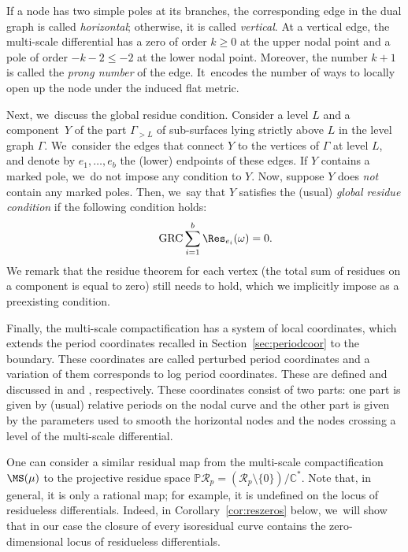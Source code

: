 If a node has two simple poles at its branches, the corresponding edge in the dual graph is called {\em horizontal}; otherwise, it is called {\em vertical}. At a vertical edge, the multi-scale differential has a zero of order $k\geq0$ at the upper nodal point and a pole of order $-k-2\leq-2$ at the lower nodal point.
Moreover, the number $k+1$ is called the {\em prong number} of the edge. It~encodes the number of ways to locally open up the node under the induced flat metric.

Next, we~discuss the global residue condition. Consider a level $L$ and a component~$Y$ of the part $\Gamma_{>L}$ of sub-surfaces lying strictly above $L$ in the level graph $\Gamma$. We~consider the edges that connect $Y$ to the vertices of $\Gamma$ at level $L$, and denote by $e_{1},\dots,e_{b}$ the (lower) endpoints of these edges.
If $Y$ contains a marked pole, we~do not impose any condition to $Y$. Now, suppose $Y$ does {\em not} contain any marked poles. Then, we~say that $Y$ satisfies the (usual) {\em global residue condition} if the following condition holds:\vspace*{-5pt}
\begin{equation}
\tag*{GRC}\label{GRC} \sum_{i=1}^{b}\Res_{e_{i}}(\omega) = 0.
\end{equation}
We remark that the residue theorem for each vertex (\ie the total sum of residues on a component is equal to zero) still needs to hold, which we implicitly impose as a preexisting condition.

Finally, the multi-scale compactification has a system of local coordinates, which extends the period coordinates recalled in Section~\ref{sec:periodcoor} to the boundary. These coordinates are called perturbed period coordinates and a variation of them corresponds to log period coordinates. These are defined and discussed in \cite[\S\S9.2, 13.3]{BCGGM2} and \cite[\S5]{BenBound}, respectively. These coordinates consist of two parts: one part is given by (usual) relative periods on the nodal curve and the other part is given by the parameters used to smooth the horizontal nodes and the nodes crossing a level of the multi-scale differential.\enlargethispage{\baselineskip}

\label{sub:closure}

One can consider a similar residual map from the multi-scale compactification $\MS(\mu)$ to the projective residue space $\mathbb{P} \mathcal{R}_{p} = (\mathcal{R}_{p} \setminus \{ 0 \}) / \mathbb{C}^{*}$. Note that, in general, it is only a rational map; for example, it is undefined on the locus of residueless differentials. Indeed, in Corollary~\ref{cor:reszeros} below, we~will show that in our case the closure of every isoresidual curve contains the zero-dimensional locus of residueless differentials.

